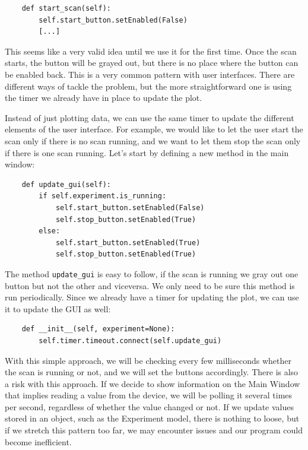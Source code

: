 \begin{verbatim}
    def start_scan(self):
        self.start_button.setEnabled(False)
        [...]
\end{verbatim}

This seems like a very valid idea until we use it for the first time. Once the scan starts, the button will be grayed out, but there is no place where the button can be enabled back. This is a very common pattern with user interfaces. There are different ways of tackle the problem, but the more straightforward one is using the timer we already have in place to update the plot.

Instead of just plotting data, we can use the same timer to update the different elements of the user interface. For example, we would like to let the user start the scan only if there is no scan running, and we want to let them stop the scan only if there is one scan running. Let's start by defining a new method in the main window:

\begin{verbatim}
    def update_gui(self):
        if self.experiment.is_running:
            self.start_button.setEnabled(False)
            self.stop_button.setEnabled(True)
        else:
            self.start_button.setEnabled(True)
            self.stop_button.setEnabled(True)
\end{verbatim}

The method \texttt{update\_gui} is easy to follow, if the scan is running we gray out one button but not the other and viceversa. We only need to be sure this method is run periodically. Since we already have a timer for updating the plot, we can use it to update the GUI as well:

\begin{verbatim}
    def __init__(self, experiment=None):
        self.timer.timeout.connect(self.update_gui)
\end{verbatim}

With this simple approach, we will be checking every few milliseconds whether the scan is running or not, and we will set the buttons accordingly. There is also a risk with this approach. If we decide to show information on the Main Window that implies reading a value from the device, we will be polling it several times per second, regardless of whether the value changed or not. If we update values stored in an object, such as the Experiment model, there is nothing to loose, but if we stretch this pattern too far, we may encounter issues and our program could become inefficient.


